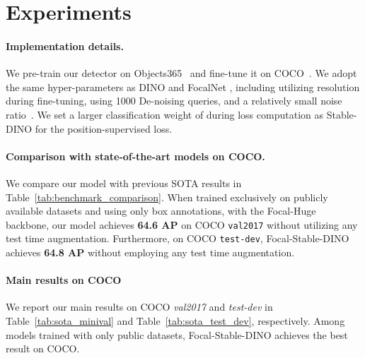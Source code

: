 \documentclass{article}
\begin{document}
 
%
 \section{Experiments}

  \paragraph{Implementation details.} We pre-train our detector on Objects365~\cite{shao2019objects365} and fine-tune it on COCO~\cite{lin2015microsoft}. We adopt the same hyper-parameters as DINO \cite{zhang2022dino} and FocalNet \cite{yang2022focal}, including utilizing  resolution during fine-tuning, using 1000 De-noising queries, and a relatively small noise ratio~\cite{li2022dn}. We set a larger classification weight of  during loss computation as Stable-DINO \cite{liu2023detection} for the position-supervised loss.

  \paragraph{Comparison with state-of-the-art models on COCO.} We compare our model with previous SOTA results in Table~\ref{tab:benchmark_comparison}. When trained exclusively on publicly available datasets and using only box annotations, with the Focal-Huge backbone, our model achieves \textbf{64.6 AP} on COCO \texttt{val2017} without utilizing any test time augmentation. Furthermore, on COCO \texttt{test-dev}, Focal-Stable-DINO achieves \textbf{64.8 AP} without employing any test time augmentation.

  
  \paragraph{Main results on COCO} We report our main results on COCO \textit{val2017} and \textit{test-dev} in Table~\ref{tab:sota_minival} and Table~\ref{tab:sota_test_dev}, respectively. Among models trained with only public datasets, Focal-Stable-DINO achieves the best result on COCO. 

  \begin{table*}[ht]
\centering\setlength{\tabcolsep}{7pt}
\renewcommand{\arraystretch}{1.5}
\footnotesize
\vspace{-0mm}
\end{table*}
 
\end{document}
